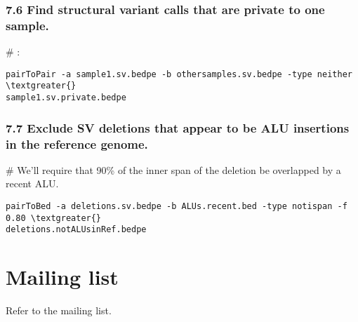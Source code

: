 \documentclass[letterpaper,10pt,english]{sphinxmanual}
\begin{document}
\subsection{7.6 Find structural variant calls that are private to one sample.}
\label{content/advanced-usage:find-structural-variant-calls-that-are-private-to-one-sample}
\# :

\begin{Verbatim}[commandchars=\\\{\}]
pairToPair -a sample1.sv.bedpe -b othersamples.sv.bedpe -type neither \textgreater{}
sample1.sv.private.bedpe
\end{Verbatim}


\subsection{7.7 Exclude SV deletions that appear to be ALU insertions in the reference genome.}
\label{content/advanced-usage:exclude-sv-deletions-that-appear-to-be-alu-insertions-in-the-reference-genome}
\# We'll require that 90\% of the inner span of the deletion be overlapped by a
recent ALU.

\begin{Verbatim}[commandchars=\\\{\}]
pairToBed -a deletions.sv.bedpe -b ALUs.recent.bed -type notispan -f 0.80 \textgreater{}
deletions.notALUsinRef.bedpe
\end{Verbatim}


\chapter{Mailing list}
\label{index:mailing-list}
Refer to the mailing list.



\renewcommand{\indexname}{Index}
\printindex
\end{document}
